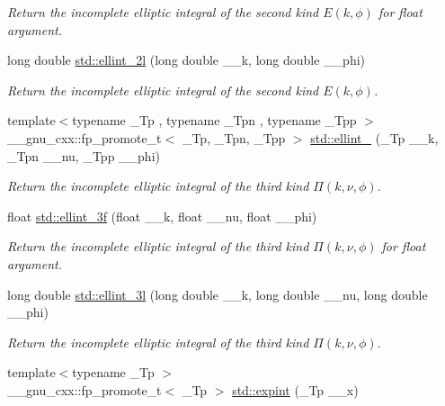 \begin{DoxyCompactItemize}
\begin{DoxyCompactList}\small\item\em Return the incomplete elliptic integral of the second kind $ E(k,\phi) $ for {\ttfamily float} argument. \end{DoxyCompactList}\item 
long double \hyperlink{group__tr29124__math__spec__func_ga5c791332d374a809d8ca16c69a1a30f5}{std\+::ellint\+\_\+2l} (long double \+\_\+\+\_\+k, long double \+\_\+\+\_\+phi)
\begin{DoxyCompactList}\small\item\em Return the incomplete elliptic integral of the second kind $ E(k,\phi) $. \end{DoxyCompactList}\item 
{\footnotesize template$<$typename \+\_\+\+Tp , typename \+\_\+\+Tpn , typename \+\_\+\+Tpp $>$ }\\\+\_\+\+\_\+gnu\+\_\+cxx\+::fp\+\_\+promote\+\_\+t$<$ \+\_\+\+Tp, \+\_\+\+Tpn, \+\_\+\+Tpp $>$ \hyperlink{group__tr29124__math__spec__func_gaac0240d1e7e401e652b9d1adf4c7e029}{std\+::ellint\+\_} (\+\_\+\+Tp \+\_\+\+\_\+k, \+\_\+\+Tpn \+\_\+\+\_\+nu, \+\_\+\+Tpp \+\_\+\+\_\+phi)
\begin{DoxyCompactList}\small\item\em Return the incomplete elliptic integral of the third kind $ \Pi(k,\nu,\phi) $. \end{DoxyCompactList}\item 
float \hyperlink{group__tr29124__math__spec__func_ga1a80bd2c15bc9fbecda2630a9e9409e7}{std\+::ellint\+\_\+3f} (float \+\_\+\+\_\+k, float \+\_\+\+\_\+nu, float \+\_\+\+\_\+phi)
\begin{DoxyCompactList}\small\item\em Return the incomplete elliptic integral of the third kind $ \Pi(k,\nu,\phi) $ for {\ttfamily float} argument. \end{DoxyCompactList}\item 
long double \hyperlink{group__tr29124__math__spec__func_gaa8c0e5864df8769021a7f3e21a30c5d2}{std\+::ellint\+\_\+3l} (long double \+\_\+\+\_\+k, long double \+\_\+\+\_\+nu, long double \+\_\+\+\_\+phi)
\begin{DoxyCompactList}\small\item\em Return the incomplete elliptic integral of the third kind $ \Pi(k,\nu,\phi) $. \end{DoxyCompactList}\item 
{\footnotesize template$<$typename \+\_\+\+Tp $>$ }\\\+\_\+\+\_\+gnu\+\_\+cxx\+::fp\+\_\+promote\+\_\+t$<$ \+\_\+\+Tp $>$ \hyperlink{group__tr29124__math__spec__func_ga0e9ac717a106ef54184b5f058c451782}{std\+::expint} (\+\_\+\+Tp \+\_\+\+\_\+x)

\end{DoxyCompactItemize}
